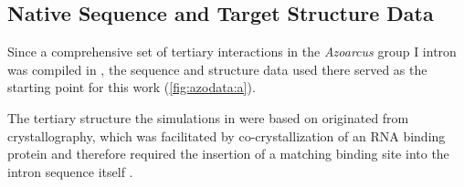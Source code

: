 \documentclass[../../master.tex]{subfiles}
\begin{document}
\subsection{Native Sequence and Target Structure Data}
\label{sub:theory:seqtargetstruct}

Since a comprehensive set of tertiary interactions in the \textit{Azoarcus} group I intron was compiled in \parencite{mustoe_secondary_2016}, the sequence and structure data used there served as the starting point for this work (\autoref{fig:azodata:a}).

The tertiary structure the simulations in \parencite{mustoe_secondary_2016} were based on originated from crystallography, which was facilitated by co-crystallization of an RNA binding protein and therefore required the insertion of a matching binding site into the intron sequence itself \parencite{adams_crystal_2004}.
\end{document}
